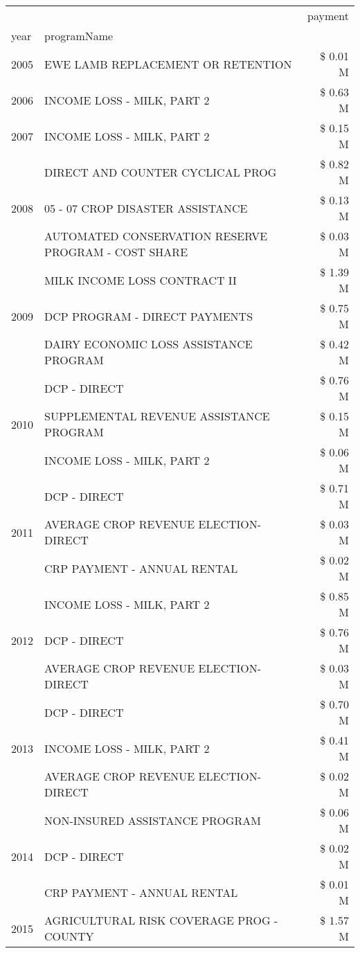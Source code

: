 \begin{tabular}{llr}
\toprule
 &  & payment \\
year & programName &  \\
\midrule
2005 & EWE LAMB REPLACEMENT OR RETENTION & \$ 0.01 M \\
\cline{1-3}
2006 & INCOME LOSS - MILK, PART 2 & \$ 0.63 M \\
\cline{1-3}
2007 & INCOME LOSS - MILK, PART 2 & \$ 0.15 M \\
\cline{1-3}
\multirow[t]{3}{*}{2008} & DIRECT AND COUNTER CYCLICAL PROG & \$ 0.82 M \\
 & 05 - 07 CROP DISASTER ASSISTANCE & \$ 0.13 M \\
 & AUTOMATED CONSERVATION RESERVE PROGRAM - COST SHARE & \$ 0.03 M \\
\cline{1-3}
\multirow[t]{3}{*}{2009} & MILK INCOME LOSS CONTRACT II & \$ 1.39 M \\
 & DCP PROGRAM - DIRECT PAYMENTS & \$ 0.75 M \\
 & DAIRY ECONOMIC LOSS ASSISTANCE PROGRAM & \$ 0.42 M \\
\cline{1-3}
\multirow[t]{3}{*}{2010} & DCP - DIRECT & \$ 0.76 M \\
 & SUPPLEMENTAL REVENUE ASSISTANCE PROGRAM & \$ 0.15 M \\
 & INCOME LOSS - MILK, PART 2 & \$ 0.06 M \\
\cline{1-3}
\multirow[t]{3}{*}{2011} & DCP - DIRECT & \$ 0.71 M \\
 & AVERAGE CROP REVENUE ELECTION-DIRECT & \$ 0.03 M \\
 & CRP PAYMENT - ANNUAL RENTAL & \$ 0.02 M \\
\cline{1-3}
\multirow[t]{3}{*}{2012} & INCOME LOSS - MILK, PART 2 & \$ 0.85 M \\
 & DCP - DIRECT & \$ 0.76 M \\
 & AVERAGE CROP REVENUE ELECTION-DIRECT & \$ 0.03 M \\
\cline{1-3}
\multirow[t]{3}{*}{2013} & DCP - DIRECT & \$ 0.70 M \\
 & INCOME LOSS - MILK, PART 2 & \$ 0.41 M \\
 & AVERAGE CROP REVENUE ELECTION-DIRECT & \$ 0.02 M \\
\cline{1-3}
\multirow[t]{3}{*}{2014} & NON-INSURED ASSISTANCE PROGRAM & \$ 0.06 M \\
 & DCP - DIRECT & \$ 0.02 M \\
 & CRP PAYMENT - ANNUAL RENTAL & \$ 0.01 M \\
\cline{1-3}
\multirow[t]{3}{*}{2015} & AGRICULTURAL RISK COVERAGE PROG - COUNTY & \$ 1.57 M \\

\end{tabular}
